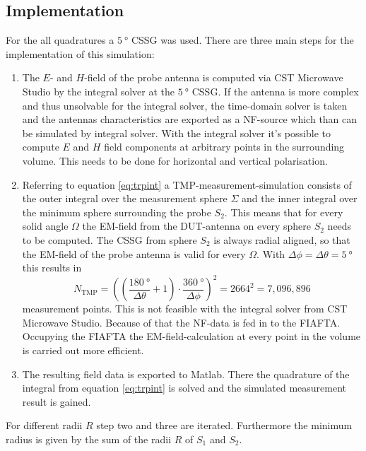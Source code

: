 \subsection{Implementation}

For the all quadratures a $\SI{5}{\degree}$ \ac{CSSG} was used. There are three main steps for the implementation of this simulation:

\begin{enumerate}
\item The $E$- and $H$-field of the probe antenna is computed via CST Microwave Studio\texttrademark{} by the integral solver at the $\SI{5}{\degree}$ \ac{CSSG}. If the antenna is more complex and thus unsolvable for the integral solver, the time-domain solver is taken and the antennas characteristics are exported as a \ac{NF}-source which than can be simulated by integral solver. With the integral solver it's possible to compute $E$ and $H$ field components at arbitrary points in the surrounding volume. This needs to be done for horizontal and vertical polarisation.
\item Referring to equation \ref{eq:trpint} a \ac{TMP}-measurement-simulation consists of the outer integral over the measurement sphere $\Sigma$ and the inner integral over the minimum sphere surrounding the probe $S_2$. This means that for every solid angle $\Omega$ the \ac{EM}-field from the \ac{DUT}-antenna on every sphere $S_2$ needs to be computed. The \ac{CSSG} from sphere $S_2$ is always radial aligned, so that the \ac{EM}-field of the probe antenna is valid for every $\Omega$. With $\Delta\phi=\Delta\theta=\SI{5}{\degree}$ this results in
\begin{equation}
N_\text{TMP}=\left(\left(\frac{\SI{180}{\degree}}{\Delta\theta}+1\right)\cdot\frac{\SI{360}{\degree}}{\Delta\phi}\right)^2=2664^2=7,096,896
\end{equation}
measurement points. This is not feasible with the integral solver from CST Microwave Studio\texttrademark{}. Because of that the \ac{NF}-data is fed in to the \ac{FIAFTA}. Occupying the \ac{FIAFTA} the \ac{EM}-field-calculation at every point in the volume is carried out more efficient.\cite{mypaper} \cite{fiafta}
\item The resulting field data is exported to Matlab\texttrademark{}. There the quadrature of the integral from equation \ref{eq:trpint} is solved and the simulated measurement result is gained.
\end{enumerate} 

For different radii $R$ step two and three are iterated. Furthermore the minimum radius is given by the sum of the radii $R$ of $S_1$ and $S_2$.

